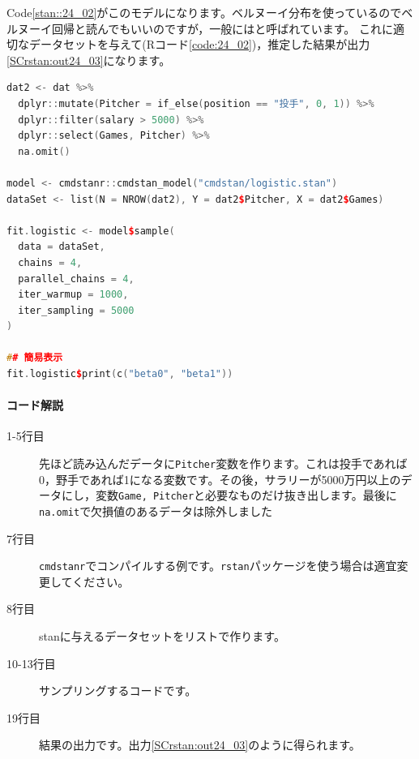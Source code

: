 \documentclass{ltjsbook}
\begin{document}
Code\ref{stan::24_02}がこのモデルになります。ベルヌーイ分布を使っているのでベルヌーイ回帰と読んでもいいのですが，一般にはと呼ばれています。
これに適切なデータセットを与えて(Rコード\ref{code:24_02})，推定した結果が出力\ref{SCrstan:out24_03}になります。

\begin{lstlisting}[language=c++,label={code:24_02},caption={ロジスティック回帰分析を実行するRコード}]
dat2 <- dat %>%
  dplyr::mutate(Pitcher = if_else(position == "投手", 0, 1)) %>%
  dplyr::filter(salary > 5000) %>%
  dplyr::select(Games, Pitcher) %>%
  na.omit()

model <- cmdstanr::cmdstan_model("cmdstan/logistic.stan")
dataSet <- list(N = NROW(dat2), Y = dat2$Pitcher, X = dat2$Games)

fit.logistic <- model$sample(
  data = dataSet,
  chains = 4,
  parallel_chains = 4,
  iter_warmup = 1000,
  iter_sampling = 5000
)

## 簡易表示
fit.logistic$print(c("beta0", "beta1"))
\end{lstlisting}
\paragraph{コード解説}
\begin{description}
	\item[1-5行目] 先ほど読み込んだデータに\verb|Pitcher|変数を作ります。これは投手であれば0，野手であれば1になる変数です。その後，サラリーが5000万円以上のデータにし，変数\verb|Game, Pitcher|と必要なものだけ抜き出します。最後に\verb|na.omit|で欠損値のあるデータは除外しました
	\item[7行目] \texttt{cmdstanr}でコンパイルする例です。\texttt{rstan}パッケージを使う場合は適宜変更してください。
	\item[8行目] stanに与えるデータセットをリストで作ります。
	\item[10-13行目] サンプリングするコードです。
	\item[19行目] 結果の出力です。出力\ref{SCrstan:out24_03}のように得られます。
\end{description}
\end{document}
